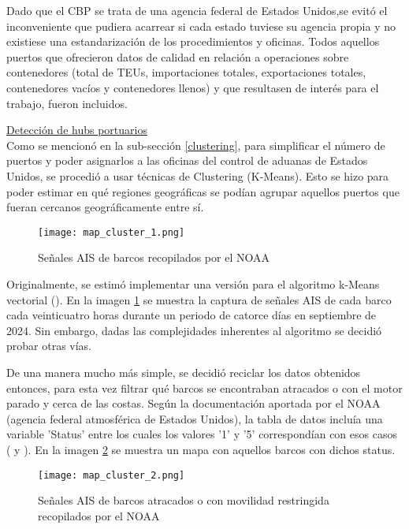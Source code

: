 \documentclass[12pt]{article}
\begin{document}
		Dado que el CBP se trata de una agencia federal de Estados Unidos,se evitó el inconveniente que pudiera acarrear si cada estado tuviese su agencia propia y no existiese una estandarización de los procedimientos y oficinas. Todos aquellos puertos que ofrecieron datos de calidad en relación a operaciones sobre contenedores (total de TEUs, importaciones totales, exportaciones totales, contenedores vacíos y contenedores llenos) y que resultasen de interés para el trabajo, fueron incluidos.
		
		\underline{Detección de hubs portuarios}\\ %
		Como se mencionó en la sub-sección \ref{clustering}, para simplificar el número de puertos y poder asignarlos a las oficinas del control de aduanas de Estados Unidos, se procedió a usar técnicas de Clustering (K-Means). Esto se hizo para poder estimar en qué regiones geográficas se podían agrupar aquellos puertos que fueran cercanos geográficamente entre sí. 
		
		\begin{figure}[H]
			\caption{\label{map_cluster_1} Señales AIS de barcos recopilados por el NOAA}
			\centering
			\texttt{[image: map\_cluster\_1.png]}
		\end{figure}
		
		Originalmente, se estimó implementar una versión para el algoritmo k-Means vectorial (\cite{ferreira2012vectorfieldkmeansclustering}). En la imagen \ref{map_cluster_1} se muestra la captura de señales AIS de cada barco cada veinticuatro horas durante un periodo de catorce días en septiembre de 2024. Sin embargo, dadas las complejidades inherentes al algoritmo se decidió probar otras vías.
		
		De una manera mucho más simple, se decidió reciclar los datos obtenidos entonces, para esta vez filtrar qué barcos se encontraban atracados o con el motor parado y cerca de las costas. Según la documentación aportada por el NOAA (agencia federal atmosférica de Estados Unidos), la tabla de datos incluía una variable 'Status' entre los cuales los valores '1' y '5' correspondían con esos casos (\cite{NOAA_AIS_DataDictionary} y \cite{MarineTraffic_AIS_Status}). En la imagen \ref{map_cluster_2} se muestra un mapa con aquellos barcos con dichos status.
		
		\begin{figure}[H]
			\caption{\label{map_cluster_2} Señales AIS de barcos atracados o con movilidad restringida recopilados por el NOAA}
			\centering
			\hspace*{1cm}
			\texttt{[image: map\_cluster\_2.png]}
		\end{figure}
	
\end{document}
